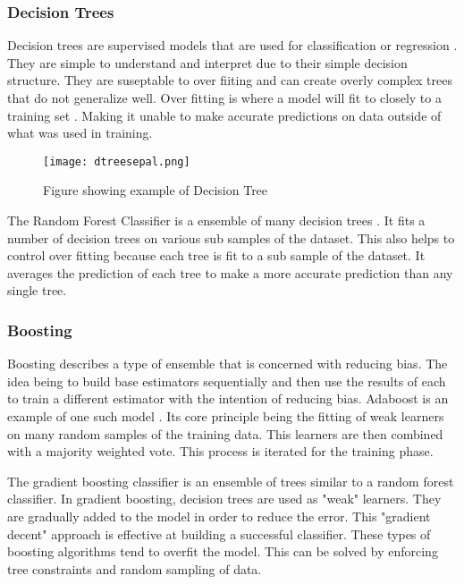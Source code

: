 \subsubsection{Decision Trees}
Decision trees are supervised models that are used for classification or regression \cite{breiman2017classification}.
They are simple to understand and interpret due to their simple decision structure. 
They are suseptable to over fiiting and can create overly complex trees that do not generalize well.
Over fitting is where a model will fit to closely to a training set \cite{cawley2010over}. 
Making it unable to make accurate predictions on data outside of what was used in training.

\begin{figure}[h]
    \centering
    \texttt{[image: dtreesepal.png]}
    \caption{Figure showing example of Decision Tree}
    \label{}
\end{figure}

\par
The Random Forest Classifier is a ensemble of many decision trees \cite{breiman2001random}.
It fits a number of decision trees on various sub samples of the dataset.
This also helps to control over fitting because each tree is fit to a sub sample of the dataset.
It averages the prediction of each tree to make a more accurate prediction than any single tree.


\subsubsection{Boosting}
Boosting describes a type of ensemble that is concerned with reducing bias.
The idea being to build base estimators sequentially and then use the results of each to train a different estimator with the intention of reducing bias.
Adaboost is an example of one such model \cite{freund1995desicion}.
Its core principle being the fitting of weak learners on many random samples of the training data.
This learners are then combined with a majority weighted vote. 
This process is iterated for the training phase.



\par
The gradient boosting classifier is an ensemble of trees similar to a random forest classifier.
In gradient boosting, decision trees are used as "weak" learners.
They are gradually added to the model in order to reduce the error.
This "gradient decent" approach is effective at building a successful classifier.
These types of boosting algorithms tend to overfit the model.
This can be solved by enforcing tree constraints and random sampling of data.


